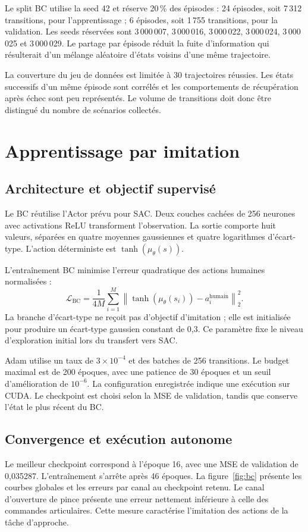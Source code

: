 \documentclass[conference,a4paper]{IEEEtran}
\newcommand{\code}[1]{\texttt{\detokenize{#1}}}
\begin{document}
Le split BC utilise la seed 42 et réserve 20\,\% des épisodes : 24 épisodes, soit 7\,312 transitions, pour l'apprentissage ; 6 épisodes, soit 1\,755 transitions, pour la validation. Les seeds réservées sont 3\,000\,007, 3\,000\,016, 3\,000\,022, 3\,000\,024, 3\,000\,025 et 3\,000\,029. Le partage par épisode réduit la fuite d'information qui résulterait d'un mélange aléatoire d'états voisins d'une même trajectoire.

La couverture du jeu de données est limitée à 30 trajectoires réussies. Les états successifs d'un même épisode sont corrélés et les comportements de récupération après échec sont peu représentés. Le volume de transitions doit donc être distingué du nombre de scénarios collectés.

\section{Apprentissage par imitation}
\subsection{Architecture et objectif supervisé}
Le BC réutilise l'Actor prévu pour SAC. Deux couches cachées de 256 neurones avec activations ReLU transforment l'observation. La sortie comporte huit valeurs, séparées en quatre moyennes gaussiennes et quatre logarithmes d'écart-type. L'action déterministe est $\tanh(\mu_\theta(s))$.

L'entraînement BC minimise l'erreur quadratique des actions humaines normalisées :
\begin{equation}
\mathcal{L}_{\mathrm{BC}}=\frac{1}{4M}\sum_{i=1}^{M}
\left\|\tanh(\mu_\theta(s_i))-a_i^{\mathrm{humain}}\right\|_2^2.
\end{equation}
La branche d'écart-type ne reçoit pas d'objectif d'imitation ; elle est initialisée pour produire un écart-type gaussien constant de 0,3. Ce paramètre fixe le niveau d'exploration initial lors du transfert vers SAC.

Adam utilise un taux de $3\times10^{-4}$ et des batches de 256 transitions. Le budget maximal est de 200 époques, avec une patience de 30 époques et un seuil d'amélioration de $10^{-6}$. La configuration enregistrée indique une exécution sur CUDA. Le checkpoint \code{best.pt} est choisi selon la MSE de validation, tandis que \code{latest.pt} conserve l'état le plus récent du BC.

\subsection{Convergence et exécution autonome}
Le meilleur checkpoint correspond à l'époque 16, avec une MSE de validation de 0,035287. L'entraînement s'arrête après 46 époques. La figure~\ref{fig:bc} présente les courbes globales et les erreurs par canal au checkpoint retenu. Le canal d'ouverture de pince présente une erreur nettement inférieure à celle des commandes articulaires. Cette mesure caractérise l'imitation des actions de la tâche d'approche.
\end{document}
